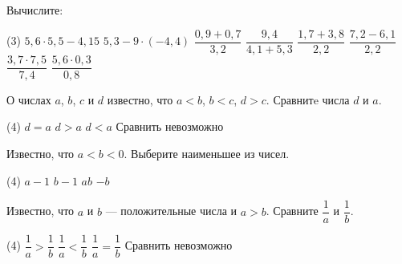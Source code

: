 \begin{homework}[number=2]
	\begin{listofex}
		\item Вычислите:
		\begin{tasks}(3)
			\task \( 5,6\cdot5,5-4,15 \)
			\task \( 5,3-9\cdot(-4,4) \)
			\task \( \dfrac{0,9+0,7}{3,2} \)
			\task \( \dfrac{9,4}{4,1+5,3} \)
			\task \( \dfrac{1,7+3,8}{2,2} \)
			\task \( \dfrac{7,2-6,1}{2,2} \)
			\task \( \dfrac{3,7\cdot7,5}{7,4} \)
			\task \( \dfrac{5,6\cdot0,3}{0,8} \)
		\end{tasks}
		\item О числах \( a \), \( b \), \( c \) и \( d \) известно, что \( a<b \), \( b<c \), \( d>c \). Сравнитe числа \( d \) и \( a \).
		\begin{tasks}(4)
			\task \( d=a \)
			\task \( d>a \)
			\task \( d<a \)
			\task Сравнить невозможно
		\end{tasks}
		\item Известно, что \( a<b<0 \). Выберите наименьшее из чисел.
		\begin{tasks}(4)
			\task \( a-1 \)
			\task \( b-1 \)
			\task \( ab \)
			\task \( -b \)
		\end{tasks}
		\item Известно, что \( a \) и \( b \) --- положительные числа и \( a>b \). Сравните \( \dfrac{1}{a} \) и \( \dfrac{1}{b} \).
		\begin{tasks}(4)
			\task \( \dfrac{1}{a}>\dfrac{1}{b} \)
			\task \( \dfrac{1}{a}<\dfrac{1}{b} \)
			\task \( \dfrac{1}{a}=\dfrac{1}{b} \)
			\task Сравнить невозможно
		\end{tasks} 
	\end{listofex}
\end{homework}

